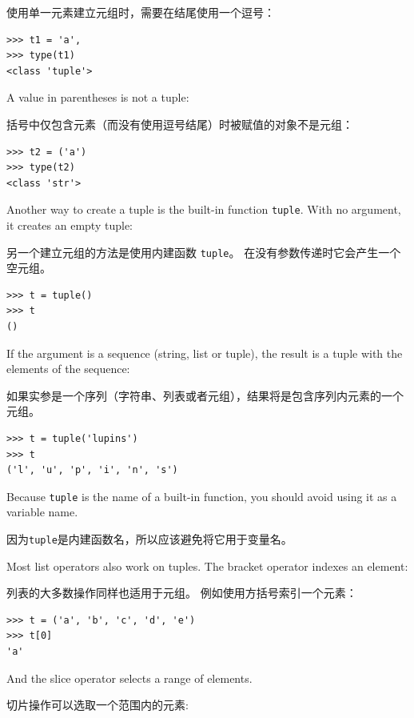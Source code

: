使用单一元素建立元组时，需要在结尾使用一个逗号：


\begin{lstlisting}
>>> t1 = 'a',
>>> type(t1)
<class 'tuple'>
\end{lstlisting}
%
A value in parentheses is not a tuple:

括号中仅包含元素（而没有使用逗号结尾）时被赋值的对象不是元组：

\begin{lstlisting}
>>> t2 = ('a')
>>> type(t2)
<class 'str'>
\end{lstlisting}
%
Another way to create a tuple is the built-in function {\tt tuple}.
With no argument, it creates an empty tuple:

另一个建立元组的方法是使用内建函数 \lstinline{tuple}。 在没有参数传递时它会产生一个空元组。

\begin{lstlisting}
>>> t = tuple()
>>> t
()
\end{lstlisting}

%
If the argument is a sequence (string, list or tuple), the result
is a tuple with the elements of the sequence:

如果实参是一个序列（字符串、列表或者元组），结果将是包含序列内元素的一个元组。

\begin{lstlisting}
>>> t = tuple('lupins')
>>> t
('l', 'u', 'p', 'i', 'n', 's')
\end{lstlisting}
%
Because {\tt tuple} is the name of a built-in function, you should
avoid using it as a variable name.

因为\lstinline{tuple}是内建函数名，所以应该避免将它用于变量名。


Most list operators also work on tuples.  The bracket operator
indexes an element:

列表的大多数操作同样也适用于元组。 例如使用方括号索引一个元素：


\begin{lstlisting}
>>> t = ('a', 'b', 'c', 'd', 'e')
>>> t[0]
'a'
\end{lstlisting}
%
And the slice operator selects a range of elements.

切片操作可以选取一个范围内的元素:
  
  
  
  

